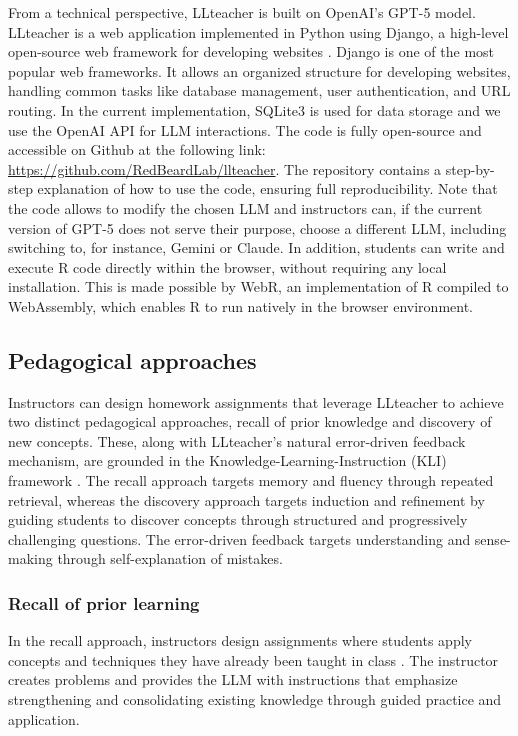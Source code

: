 \documentclass[
  12pt]{article}
\begin{document}
From a technical perspective, LLteacher is built on OpenAI's GPT-5 model. 
LLteacher is a web application implemented in Python using Django, a high-level open-source web framework for developing websites \citep{forcier-et-al-2008}. 
Django is one of the most popular web frameworks. It allows an organized structure for developing websites, handling common tasks like database management, user authentication, and URL routing.
In the current implementation, SQLite3 is used for data storage and we use the OpenAI API for LLM interactions.
The code is fully open-source and accessible on Github at the following link: \href{https://github.com/RedBeardLab/llteacher}{https://github.com/RedBeardLab/llteacher}.
The repository contains a step-by-step explanation of how to use the code, ensuring full reproducibility.
Note that the code allows to modify the chosen LLM and instructors can, if the current version of GPT-5 does not serve their purpose, choose a different LLM, including switching to, for instance, Gemini or Claude.
In addition, students can write and execute R code directly within the browser, without requiring any local installation. This is made possible by WebR, an implementation of R compiled to WebAssembly, which enables R to run natively in the browser environment.


\subsection{Pedagogical approaches}

Instructors can design homework assignments that leverage LLteacher to achieve two distinct pedagogical approaches, recall of prior knowledge and discovery of new concepts. These, along with LLteacher's natural error-driven feedback mechanism, are grounded in the Knowledge-Learning-Instruction (KLI) framework \citep{stamper2024enhancing}. The recall approach targets memory and fluency through repeated retrieval, whereas the discovery approach targets induction and refinement by guiding students to discover concepts through structured and progressively challenging questions. The error-driven feedback targets understanding and sense-making through self-explanation of mistakes.

\subsubsection{Recall of prior learning}

In the recall approach, instructors design assignments where students apply concepts and techniques they have already been taught in class \citep{karpicke-et-al-2012}. The instructor creates problems and provides the LLM with instructions that emphasize strengthening and consolidating existing knowledge through guided practice and application.
\end{document}
